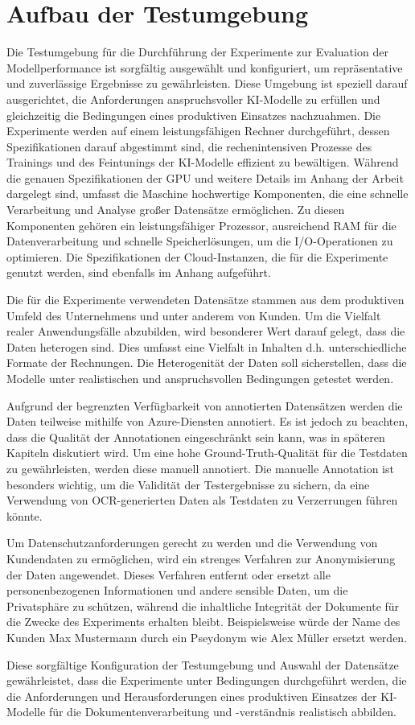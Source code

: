 \section{Aufbau der Testumgebung}
Die Testumgebung für die Durchführung der Experimente zur Evaluation der Modellperformance ist sorgfältig ausgewählt und konfiguriert, um repräsentative und zuverlässige Ergebnisse zu gewährleisten. Diese Umgebung ist speziell darauf ausgerichtet, die Anforderungen anspruchsvoller KI-Modelle zu erfüllen und gleichzeitig die Bedingungen eines produktiven Einsatzes nachzuahmen.
Die Experimente werden auf einem leistungsfähigen Rechner durchgeführt, dessen Spezifikationen darauf abgestimmt sind, die rechenintensiven Prozesse des Trainings und des Feintunings der KI-Modelle effizient zu bewältigen. Während die genauen Spezifikationen der GPU und weitere Details im Anhang der Arbeit dargelegt sind, umfasst die Maschine hochwertige Komponenten, die eine schnelle Verarbeitung und Analyse großer Datensätze ermöglichen. Zu diesen Komponenten gehören ein leistungsfähiger Prozessor, ausreichend RAM für die Datenverarbeitung und schnelle Speicherlösungen, um die I/O-Operationen zu optimieren. Die Spezifikationen der Cloud-Instanzen, die für die Experimente genutzt werden, sind ebenfalls im Anhang aufgeführt.

Die für die Experimente verwendeten Datensätze stammen aus dem produktiven Umfeld des Unternehmens und unter anderem von Kunden. Um die Vielfalt realer Anwendungsfälle abzubilden, wird besonderer Wert darauf gelegt, dass die Daten heterogen sind. Dies umfasst eine Vielfalt in Inhalten d.h. unterschiedliche Formate der Rechnungen. Die Heterogenität der Daten soll sicherstellen, dass die Modelle unter realistischen und anspruchsvollen Bedingungen getestet werden.

Aufgrund der begrenzten Verfügbarkeit von annotierten Datensätzen werden die Daten teilweise mithilfe von Azure-Diensten annotiert. Es ist jedoch zu beachten, dass die Qualität der Annotationen eingeschränkt sein kann, was in späteren Kapiteln diskutiert wird. Um eine hohe Ground-Truth-Qualität für die Testdaten zu gewährleisten, werden diese manuell annotiert. Die manuelle Annotation ist besonders wichtig, um die Validität der Testergebnisse zu sichern, da eine Verwendung von OCR-generierten Daten als Testdaten zu Verzerrungen führen könnte.

Um Datenschutzanforderungen gerecht zu werden und die Verwendung von Kundendaten zu ermöglichen, wird ein strenges Verfahren zur Anonymisierung der Daten angewendet. Dieses Verfahren entfernt oder ersetzt alle personenbezogenen Informationen und andere sensible Daten, um die Privatsphäre zu schützen, während die inhaltliche Integrität der Dokumente für die Zwecke des Experiments erhalten bleibt. Beispielsweise würde der Name des Kunden Max Mustermann durch ein Pseydonym wie Alex Müller ersetzt werden. 

Diese sorgfältige Konfiguration der Testumgebung und Auswahl der Datensätze gewährleistet, dass die Experimente unter Bedingungen durchgeführt werden, die die Anforderungen und Herausforderungen eines produktiven Einsatzes der KI-Modelle für die Dokumentenverarbeitung und -verständnis realistisch abbilden.